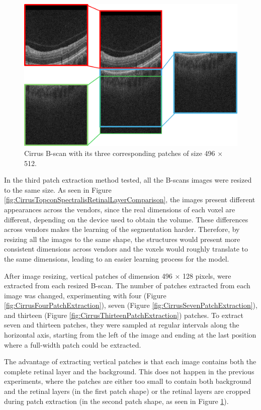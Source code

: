 \begin{figure}[!ht]
	\centering
	\includegraphics[width=0.65\linewidth]{figures/BigPatchExtraction.png}
	\caption{Cirrus B-scan with its three corresponding patches of size 496 $\times$ 512.}
	\label{fig:BigPatchExtraction}
\end{figure}

In the third patch extraction method tested, all the B-scans images were resized to the same size. As seen in Figure \ref{fig:CirrusTopconSpectralisRetinalLayerComparison}, the images present different appearances across the vendors, since the real dimensions of each voxel are different, depending on the device used to obtain the volume. These differences across vendors makes the learning of the segmentation harder. Therefore, by resizing all the images to the same shape, the structures would present more consistent dimensions across vendors and the voxels would roughly translate to the same dimensions, leading to an easier learning process for the model.
\par
After image resizing, vertical patches of dimension 496 $\times$ 128 pixels, were extracted from each resized B-scan. The number of patches extracted from each image was changed, experimenting with four (Figure \ref{fig:CirrusFourPatchExtraction}), seven (Figure \ref{fig:CirrusSevenPatchExtraction}), and thirteen (Figure \ref{fig:CirrusThirteenPatchExtraction}) patches. To extract seven and thirteen patches, they were sampled at regular intervals along the horizontal axis, starting from the left of the image and ending at the last position where a full-width patch could be extracted.
\par
The advantage of extracting vertical patches is that each image contains both the complete retinal layer and the background. This does not happen in the previous experiments, where the patches are either too small to contain both background and the retinal layers (in the first patch shape) or the retinal layers are cropped during patch extraction (in the second patch shape, as seen in Figure \ref{fig:BigPatchExtraction}).

